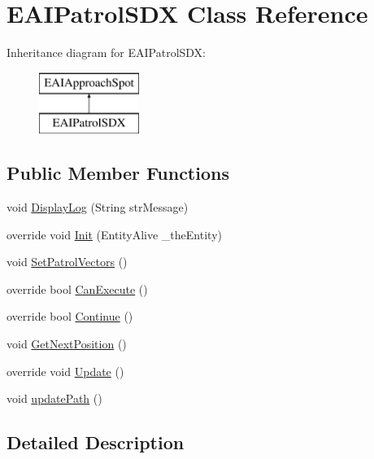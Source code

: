 \hypertarget{class_e_a_i_patrol_s_d_x}{}\section{E\+A\+I\+Patrol\+S\+DX Class Reference}
\label{class_e_a_i_patrol_s_d_x}
Inheritance diagram for E\+A\+I\+Patrol\+S\+DX\+:\begin{figure}[H]
\begin{center}
\leavevmode
\includegraphics[height=2.000000cm]{de/dd5/class_e_a_i_patrol_s_d_x}
\end{center}
\end{figure}
\subsection*{Public Member Functions}
\begin{DoxyCompactItemize}
\item 
void \mbox{\hyperlink{class_e_a_i_patrol_s_d_x_a52cbc47fa43745d8429bfc1e96635103}{Display\+Log}} (String str\+Message)
\item 
override void \mbox{\hyperlink{class_e_a_i_patrol_s_d_x_a0b9c075e2bbbdeec6795454373e5f9ff}{Init}} (Entity\+Alive \+\_\+the\+Entity)
\item 
void \mbox{\hyperlink{class_e_a_i_patrol_s_d_x_a43dbbcac3d5d87e72ebd8e064ff18b0e}{Set\+Patrol\+Vectors}} ()
\item 
override bool \mbox{\hyperlink{class_e_a_i_patrol_s_d_x_a9039242e863a0e5a0381c01d4204487f}{Can\+Execute}} ()
\item 
override bool \mbox{\hyperlink{class_e_a_i_patrol_s_d_x_a1adab2eea226eb846a0fe918e9032fcf}{Continue}} ()
\item 
void \mbox{\hyperlink{class_e_a_i_patrol_s_d_x_a86fefa31acd885849b189ec650c86416}{Get\+Next\+Position}} ()
\item 
override void \mbox{\hyperlink{class_e_a_i_patrol_s_d_x_a2f5d21b77a20f5d874360967ab33bfe8}{Update}} ()
\item 
void \mbox{\hyperlink{class_e_a_i_patrol_s_d_x_a5772708c95969db9a421148b7b3ac1e3}{update\+Path}} ()
\end{DoxyCompactItemize}


\subsection{Detailed Description}


